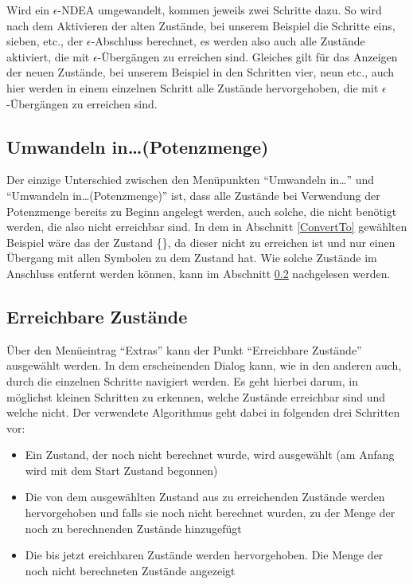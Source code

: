 Wird ein $\epsilon$-NDEA umgewandelt, kommen jeweils zwei Schritte dazu. So wird
nach dem Aktivieren der alten Zustände, bei unserem Beispiel die Schritte eins,
sieben, etc., der $\epsilon$-Abschluss berechnet, es werden also auch alle
Zustände aktiviert, die mit $\epsilon$-Übergängen zu erreichen sind. Gleiches
gilt für das Anzeigen der neuen Zustände, bei unserem Beispiel in den Schritten
vier, neun etc., auch hier werden in einem einzelnen Schritt alle Zustände
hervorgehoben, die mit $\epsilon$-Übergängen zu erreichen sind.


\subsection{Umwandeln in\ldots (Potenzmenge)}
Der einzige Unterschied zwischen den Menüpunkten "`Umwandeln in\ldots"' und
"`Umwandeln in\ldots (Potenzmenge)"' ist, dass alle Zustände bei Verwendung der
Potenzmenge bereits zu Beginn angelegt werden, auch solche, die nicht benötigt
werden, die also nicht erreichbar sind. In dem in Abschnitt \ref{ConvertTo}
gewählten Beispiel wäre das der Zustand \{\}, da dieser nicht zu
erreichen ist und nur einen Übergang mit allen Symbolen zu dem Zustand
\State{$\emptyset$} hat. Wie solche Zustände im Anschluss entfernt werden können,
kann im Abschnitt \ref{ReachableStates} nachgelesen werden.


\subsection{Erreichbare Zustände}\label{ReachableStates}

Über den Menüeintrag "`Extras"' kann der Punkt "`Erreichbare Zustände"'
ausgewählt werden. In dem erscheinenden Dialog kann, wie in den anderen auch,
durch die einzelnen Schritte navigiert werden. Es geht hierbei darum, in
möglichst kleinen Schritten zu erkennen, welche Zustände erreichbar sind und
welche nicht. Der verwendete Algorithmus geht dabei in folgenden drei Schritten
vor:

\begin{itemize}
  \item Ein Zustand, der noch nicht berechnet wurde, wird ausgewählt (am Anfang
  wird mit dem Start Zustand begonnen)
  \item Die von dem ausgewählten Zustand aus zu erreichenden Zustände werden
  hervorgehoben und falls sie noch nicht berechnet wurden, zu der Menge der noch
  zu berechnenden Zustände hinzugefügt
  \item Die bis jetzt ereichbaren Zustände werden hervorgehoben. Die Menge der
  noch nicht berechneten Zustände angezeigt 
\end{itemize}

